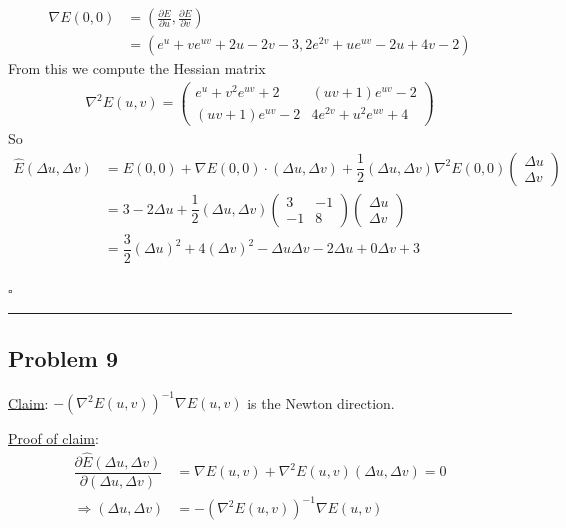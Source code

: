 \documentclass[12pt]{article}
\newcommand*{\QEDB}{\hfill\ensuremath{\square}}
\newcommand{\ParTh}[1]{\left(#1\right)}
\newcommand{\Matrix}[2]{\ParTh{\begin{array}{#1}#2\end{array}}}
\newcommand{\horrule}[1]{\rule{\linewidth}{#1}}
\begin{document}
\begin{align}
\nabla E(0,0) &= \ParTh{\frac{\partial E}{\partial u},\frac{\partial E}{\partial v}}\\
&=\ParTh{e^{u}+ve^{uv}+2u-2v-3,2e^{2v}+ue^{uv}-2u+4v-2}
\end{align}
From this we compute the Hessian matrix
\begin{align}
\nabla^2E\ParTh{u,v}=\Matrix{cc}{e^{u}+v^2e^{uv}+2&\ParTh{uv+1}e^{uv}-2\\\ParTh{uv+1}e^{uv}-2&4e^{2v}+u^2e^{uv}+4}
\end{align}
So
\begin{align}
\hat{E}\ParTh{\Delta u,\Delta v}&=E\ParTh{0,0}+\nabla E\ParTh{0,0}\cdot\ParTh{\Delta u,\Delta v}+\dfrac{1}{2}\ParTh{\Delta u,\Delta v}\nabla^2E\ParTh{0,0}\Matrix{c}{\Delta u\\\Delta v}\\
&=3-2\Delta u+\dfrac{1}{2}\ParTh{\Delta u,\Delta v}\Matrix{cc}{3&-1\\-1&8}\Matrix{c}{\Delta u\\\Delta v}\\
&=\dfrac{3}{2}\ParTh{\Delta u}^2+4\ParTh{\Delta v}^2-\Delta u\Delta v-2\Delta u+0\Delta v+3
\end{align}

\QEDB

\horrule{0.5pt}

\subsection*{Problem 9}

\underline{Claim}: $-\ParTh{\nabla^2E\ParTh{u,v}}^{-1}\nabla E\ParTh{u,v}$ is the Newton direction.

\underline{Proof of claim}:
\begin{align}
\dfrac{\partial\hat{E}\ParTh{\Delta u,\Delta v}}{\partial\ParTh{\Delta u,\Delta v}}&=\nabla E\ParTh{u,v}+\nabla^2E\ParTh{u,v}\ParTh{\Delta u,\Delta v}=0\\
\Rightarrow\ParTh{\Delta u,\Delta v}&=-\ParTh{\nabla^2E\ParTh{u,v}}^{-1}\nabla E\ParTh{u,v}
\end{align}

\end{document}
